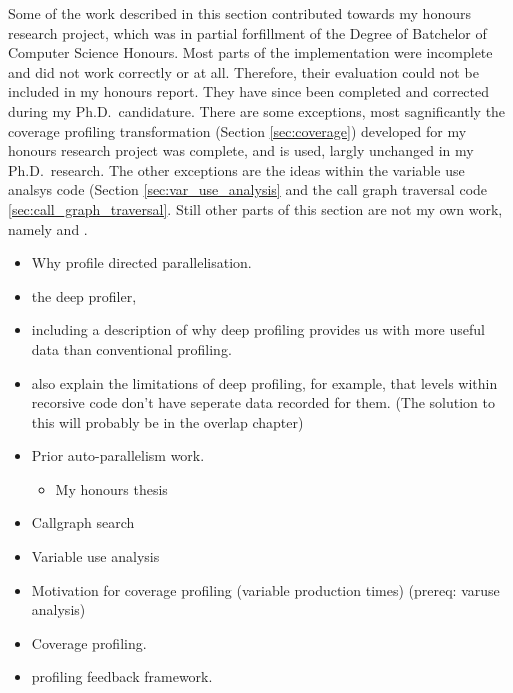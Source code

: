 

Some of the work described in this section contributed towards my honours research project,
which was in partial forfillment of the Degree of Batchelor of Computer Science
Honours.
Most parts of the implementation were incomplete and did not work correctly or
at all.
Therefore,
their evaluation could not be included in my honours report.
They have since been completed and corrected during my Ph.D.\ candidature.
There are some exceptions,
most sagnificantly the coverage profiling transformation (Section \ref{sec:coverage})
developed for my honours research project was complete, and is used, largly
unchanged in my Ph.D.\ research.
The other exceptions are the ideas within the variable use analsys code
(Section \ref{sec:var_use_analysis} and
the call graph traversal code \ref{sec:call_graph_traversal}.
Still other parts of this section are not my own work, namely
\citet{tannier:2007:parallel_mercury} and \citet{conway:2001:mercury-deep}.


\begin{itemize}
\item Why profile directed parallelisation.
\item the deep profiler,
\item including a description of why deep profiling provides us with
      more useful data than conventional profiling.
\item also explain the limitations of deep profiling,
      for example, that levels within recorsive code don't have seperate
      data recorded for them.
      (The solution to this will probably be in the overlap chapter)
\item Prior auto-parallelism work.
\begin{itemize}
    \item My honours thesis
\end{itemize}
\item Callgraph search
\item Variable use analysis
\item Motivation for coverage profiling (variable production times) (prereq:
      varuse analysis)
\item Coverage profiling. 
\item profiling feedback framework.
\end{itemize}

